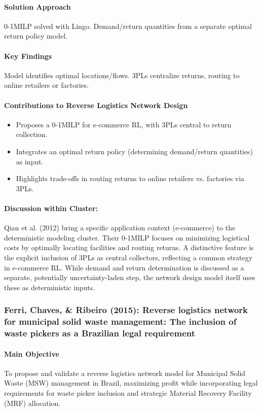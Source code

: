 \paragraph{Solution Approach} 0-1MILP solved with Lingo. Demand/return quantities from a separate optimal return policy model.
\paragraph{Key Findings} Model identifies optimal locations/flows. 3PLs centralize returns, routing to online retailers or factories.
\paragraph{Contributions to Reverse Logistics Network Design}
\begin{itemize}
    \item Proposes a 0-1MILP for e-commerce RL, with 3PLs central to return collection.
    \item Integrates an optimal return policy (determining demand/return quantities) as input.
    \item Highlights trade-offs in routing returns to online retailers vs. factories via 3PLs.
\end{itemize}
\paragraph{Discussion within Cluster:} Qian et al. (2012) bring a specific application context (e-commerce) to the deterministic modeling cluster. Their 0-1MILP focuses on minimizing logistical costs by optimally locating facilities and routing returns. A distinctive feature is the explicit inclusion of 3PLs as central collectors, reflecting a common strategy in e-commerce RL. While demand and return determination is discussed as a separate, potentially uncertainty-laden step, the network design model itself uses these as deterministic inputs.

\subsubsection{Ferri, Chaves, \& Ribeiro (2015): Reverse logistics network for municipal solid waste management: The inclusion of waste pickers as a Brazilian legal requirement}
\paragraph{Main Objective} To propose and validate a reverse logistics network model for Municipal Solid Waste (MSW) management in Brazil, maximizing profit while incorporating legal requirements for waste picker inclusion and strategic Material Recovery Facility (MRF) allocation.
